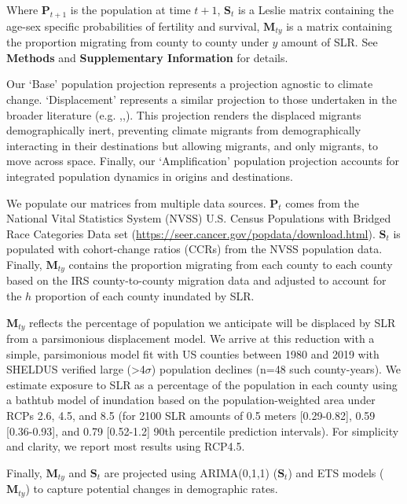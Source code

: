 \documentclass[12pt]{article}
\begin{document}
Where \(\mathbf{P}_{t+1}\) is the population at time \(t+1\),
\(\mathbf{S}_{t}\) is a Leslie matrix containing the age-sex specific
probabilities of fertility and survival, \(\mathbf{M}_{ty}\) is a matrix
containing the proportion migrating from county to county under \(y\)
amount of SLR. See \textbf{Methods} and
\textbf{Supplementary Information} for details.

Our `Base' population projection represents a projection agnostic to
climate change. `Displacement' represents a similar projection to those
undertaken in the broader literature (e.g.
\citet{hauerMigrationInducedSealevel2017},\citet{davisUniversalModelPredicting2018},\citet{robinson2020modeling}).
This projection renders the displaced migrants demographically inert,
preventing climate migrants from demographically interacting in their
destinations but allowing migrants, and only migrants, to move across
space. Finally, our `Amplification' population projection accounts for
integrated population dynamics in origins and destinations.

We populate our matrices from multiple data sources. \(\mathbf{P}_t\)
comes from the National Vital Statistics System (NVSS) U.S. Census
Populations with Bridged Race Categories Data set
(\url{https://seer.cancer.gov/popdata/download.html}). \(\mathbf{S}_t\)
is populated with cohort-change ratios (CCRs) from the NVSS population
data. Finally, \(\mathbf{M}_{ty}\) contains the proportion migrating
from each county to each county based on the IRS county-to-county
migration data \citep{molloy2011internal} and adjusted to account for
the \(h\) proportion of each county inundated by SLR.

\(\mathbf{M}_{ty}\) reflects the percentage of population we anticipate
will be displaced by SLR from a parsimonious displacement model. We
arrive at this reduction with a simple, parsimonious model fit with US
counties between 1980 and 2019 with SHELDUS verified large
(\textgreater4\(\sigma\)) population declines (n=48 such county-years).
We estimate exposure to SLR as a percentage of the population in each
county using a bathtub model of inundation based on the
population-weighted area under RCPs 2.6, 4.5, and 8.5 (for 2100 SLR
amounts of 0.5 meters {[}0.29-0.82{]}, 0.59 {[}0.36-0.93{]}, and 0.79
{[}0.52-1.2{]} 90th percentile prediction intervals). For simplicity and
clarity, we report most results using RCP4.5.

Finally, \(\mathbf{M}_{ty}\) and \(\mathbf{S}_{t}\) are projected using
ARIMA(0,1,1) (\(\mathbf{S}_t\)) and ETS models (\(\mathbf{M}_{ty}\)) to
capture potential changes in demographic rates.
\end{document}
